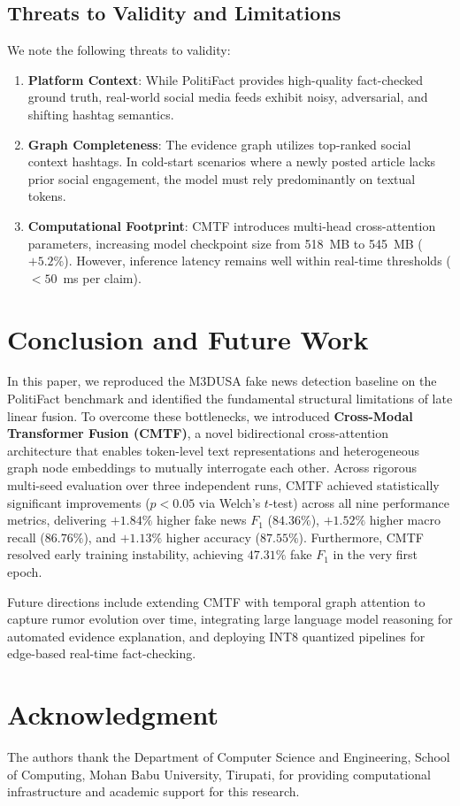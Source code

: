 \documentclass[conference]{IEEEtran}
\begin{document}
\subsection{Threats to Validity and Limitations}
We note the following threats to validity:
\begin{enumerate}
    \item \textbf{Platform Context}: While PolitiFact provides high-quality fact-checked ground truth, real-world social media feeds exhibit noisy, adversarial, and shifting hashtag semantics.
    \item \textbf{Graph Completeness}: The evidence graph utilizes top-ranked social context hashtags. In cold-start scenarios where a newly posted article lacks prior social engagement, the model must rely predominantly on textual tokens.
    \item \textbf{Computational Footprint}: CMTF introduces multi-head cross-attention parameters, increasing model checkpoint size from 518~MB to 545~MB ($+5.2\%$). However, inference latency remains well within real-time thresholds ($< 50$~ms per claim).
\end{enumerate}

\section{Conclusion and Future Work}
In this paper, we reproduced the M3DUSA fake news detection baseline on the PolitiFact benchmark and identified the fundamental structural limitations of late linear fusion. To overcome these bottlenecks, we introduced \textbf{Cross-Modal Transformer Fusion (CMTF)}, a novel bidirectional cross-attention architecture that enables token-level text representations and heterogeneous graph node embeddings to mutually interrogate each other. Across rigorous multi-seed evaluation over three independent runs, CMTF achieved statistically significant improvements ($p < 0.05$ via Welch's $t$-test) across all nine performance metrics, delivering $+1.84\%$ higher fake news $F_1$ ($84.36\%$), $+1.52\%$ higher macro recall ($86.76\%$), and $+1.13\%$ higher accuracy ($87.55\%$). Furthermore, CMTF resolved early training instability, achieving $47.31\%$ fake $F_1$ in the very first epoch.

Future directions include extending CMTF with temporal graph attention to capture rumor evolution over time, integrating large language model reasoning for automated evidence explanation, and deploying INT8 quantized pipelines for edge-based real-time fact-checking.

\section*{Acknowledgment}
The authors thank the Department of Computer Science and Engineering, School of Computing, Mohan Babu University, Tirupati, for providing computational infrastructure and academic support for this research.



\end{document}
